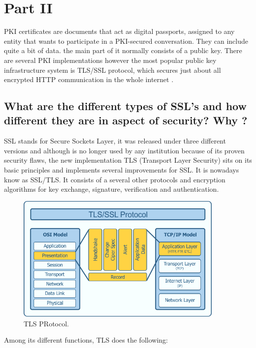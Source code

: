 \documentclass[letterpaper,12pt]{article}
\begin{document}
\section{Part II}
PKI certificates are documents that act as digital passports, assigned to any entity that wants to participate
in a PKI-secured conversation. They can include quite a bit of data. the main part of it normally consists
of a public key. There are several PKI implementations however the most popular public key
infrastructure system is TLS/SSL protocol, which secures just about all encrypted HTTP communication
in the whole internet \cite{TLS_Internet_Society}.

\subsection{What are the different types of SSL's and how different they are in aspect of security? Why ?}
SSL stands for Secure Sockets Layer, it was released under three different versions and although is no longer used by any institution because of its proven security flaws, the new implementation TLS (Transport  Layer Security) sits on its basic principles and implements several improvements for SSL. It is nowadays know as SSL/TLS. It consists of a several other protocols and encryption algorithms for key exchange, signature, verification and authentication. 

\begin{figure}[H]
    \centering
    \includegraphics[width=0.9\textwidth]{assets/TLS-added.png}
    \caption{TLS PRotocol.\cite{IOT_SSL}}
    \label{fig:TLS}
\end{figure}

Among its different functions, TLS does the following:
\end{document}
